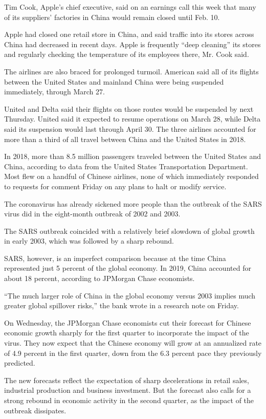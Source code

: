 Tim Cook, Apple's chief executive, said on an earnings call this week
that many of its suppliers' factories in China would remain closed until
Feb. 10.

Apple had closed one retail store in China, and said traffic into its
stores across China had decreased in recent days. Apple is frequently
``deep cleaning'' its stores and regularly checking the temperature of
its employees there, Mr. Cook said.

The airlines are also braced for prolonged turmoil. American said all of
its flights between the United States and mainland China were being
suspended immediately, through March 27.

United and Delta said their flights on those routes would be suspended
by next Thursday. United said it expected to resume operations on March
28, while Delta said its suspension would last through April 30. The
three airlines accounted for more than a third of all travel between
China and the United States in 2018.

In 2018, more than 8.5 million passengers traveled between the United
States and China, according to data from the United States
Transportation Department. Most flew on a handful of Chinese airlines,
none of which immediately responded to requests for comment Friday on
any plans to halt or modify service.

The coronavirus has already sickened more people than the outbreak of
the SARS virus did in the eight-month outbreak of 2002 and 2003.

The SARS outbreak coincided with a relatively brief slowdown of global
growth in early 2003, which was followed by a sharp rebound.

SARS, however, is an imperfect comparison because at the time China
represented just 5 percent of the global economy. In 2019, China
accounted for about 18 percent, according to JPMorgan Chase economists.

``The much larger role of China in the global economy versus 2003
implies much greater global spillover risks,'' the bank wrote in a
research note on Friday.

On Wednesday, the JPMorgan Chase economists cut their forecast for
Chinese economic growth sharply for the first quarter to incorporate the
impact of the virus. They now expect that the Chinese economy will grow
at an annualized rate of 4.9 percent in the first quarter, down from the
6.3 percent pace they previously predicted.

The new forecasts reflect the expectation of sharp decelerations in
retail sales, industrial production and business investment. But the
forecast also calls for a strong rebound in economic activity in the
second quarter, as the impact of the outbreak dissipates.

